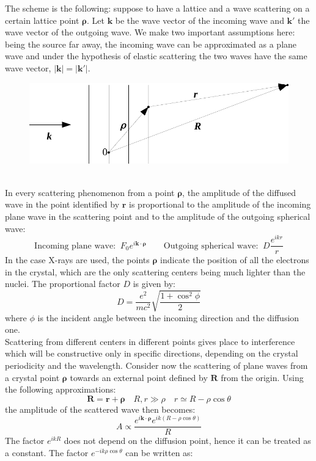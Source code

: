 \documentclass[10.75pt,a4paper,openright,bottom=2cm]{article}
\renewcommand{\Vec}[1]{\boldsymbol{#1}}
\begin{document}
The scheme is the following: suppose to have a lattice and a wave scattering on a certain lattice point $\Vec{\rho}$. Let $\Vec{k}$ be the wave vector of the incoming wave and $\Vec{k'}$ the wave vector of the outgoing wave. We make two important assumptions here: being the source far away, the incoming wave can be approximated as a plane wave and under the hypothesis of elastic scattering the two waves have the same wave vector, $|\Vec{k}|=|\Vec{k'|}$.\\
\begin{figure}[h]
    \centering
    \includegraphics{diffraction.pdf}
    \label{fig:diffraction}
\end{figure}\\
In every scattering phenomenon from a point $\Vec{\rho}$, the amplitude of the diffused wave in the point identified by $\Vec{r}$ is proportional to the amplitude of the incoming plane wave in the scattering point and to the amplitude of the outgoing spherical wave:
\[
\text{Incoming plane wave:}\;\; F_0e^{i\Vec{k}\cdot\Vec{\rho}} \qquad \text{Outgoing spherical wave:}\;\; D\frac{e^{ikr}}{r}
\]
In the case X-rays are used, the points $\Vec{\rho}$ indicate the position of all the electrons in the crystal, which are the only scattering centers being much lighter than the nuclei. The proportional factor $D$ is given by:
\[
D=\frac{e^2}{mc^2}\sqrt{\frac{1+\cos^2\phi}{2}}
\]
where $\phi$ is the incident angle between the incoming direction and the diffusion one.\\
Scattering from different centers in different points gives place to interference which will be constructive only in specific directions, depending on the crystal periodicity and the wavelength. Consider now the scattering of plane waves from a crystal point $\Vec{\rho}$ towards an external point defined by $\Vec{R}$ from the origin. Using the following approximations:
\[
\Vec{R}=\Vec{r}+\Vec{\rho} \quad R,r\gg\rho \quad r\simeq R-\rho\cos\theta
\]
the amplitude of the scattered wave then becomes:
\[
A\propto\frac{e^{i\Vec{k}\cdot\Vec{\rho}}e^{ik(R-\rho\cos\theta)}}{R}
\]
The factor $e^{ikR}$ does not depend on the diffusion point, hence it can be treated as a constant. The factor $e^{-ik\rho\cos\theta}$ can be written as:
\end{document}
